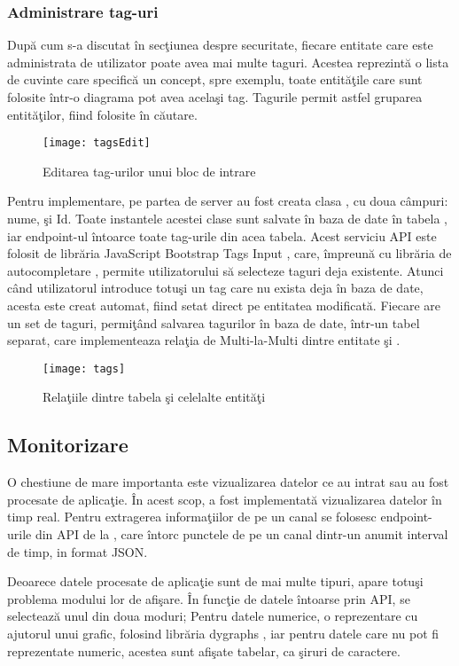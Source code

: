 \subsubsection{Administrare tag-uri}
După cum s-a discutat în secţiunea despre securitate, fiecare entitate care este administrata de utilizator poate avea mai multe taguri. Acestea reprezintă o lista de cuvinte care specifică un concept, spre exemplu, toate entităţile care sunt folosite într-o diagrama pot avea acelaşi tag. Tagurile permit astfel gruparea entităţilor, fiind folosite în căutare.
\begin{figure}[H]
	\centering
	\texttt{[image: tagsEdit]}
	\caption{Editarea tag-urilor unui bloc de intrare}
	\label{fig:tagsEdit}
\end{figure}
Pentru implementare, pe partea de server au fost creata clasa , cu doua câmpuri: nume, şi Id. Toate instantele acestei clase sunt salvate în baza de date în tabela , iar endpoint-ul  întoarce toate tag-urile din acea tabela. Acest serviciu API este folosit de librăria JavaScript Bootstrap Tags Input \autocite{tagsinput}, care, împreună cu librăria de autocompletare \autocite{typeahead}, permite utilizatorului să selecteze taguri deja existente. Atunci când utilizatorul introduce totuşi un tag care nu exista deja în baza de date, acesta este creat automat, fiind setat direct pe entitatea modificată. Fiecare  are un set de taguri, permiţând salvarea tagurilor în baza de date, într-un tabel separat, care implementeaza relaţia de Multi-la-Multi dintre entitate şi .
\begin{figure}[H]
	\centering
	\texttt{[image: tags]}
	\caption{Relaţiile dintre tabela  şi celelalte entităţi}
	\label{fig:tags}
\end{figure}
\subsection{Monitorizare}
O chestiune de mare importanta este vizualizarea datelor ce au intrat sau au fost procesate de aplicaţie. În acest scop, a fost implementată vizualizarea datelor în timp real. Pentru extragerea informaţiilor de pe un canal se folosesc endpoint-urile din API de la , care întorc punctele de pe un canal dintr-un anumit interval de timp, in format JSON.

Deoarece datele procesate de aplicaţie sunt de mai multe tipuri, apare totuşi problema modului lor de afişare. În funcţie de datele întoarse prin API, se selectează unul din doua moduri; Pentru datele numerice, o reprezentare cu ajutorul unui grafic, folosind librăria dygraphs \autocite{dygraphs}, iar pentru datele care nu pot fi reprezentate numeric, acestea sunt afişate tabelar, ca şiruri de caractere.

